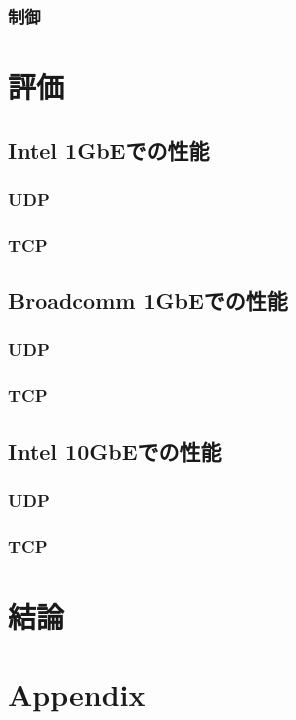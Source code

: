 \documentclass[a4paper,11pt,report]{ltjsbook}
\begin{document}
\subsection{制御}

\chapter{評価}
\section{Intel 1GbEでの性能}
\subsection{UDP}
\subsection{TCP}
\section{Broadcomm 1GbEでの性能}
\subsection{UDP}
\subsection{TCP}
\section{Intel 10GbEでの性能}
\subsection{UDP}
\subsection{TCP}

\chapter{結論}

\chapter{Appendix}


\end{document}
